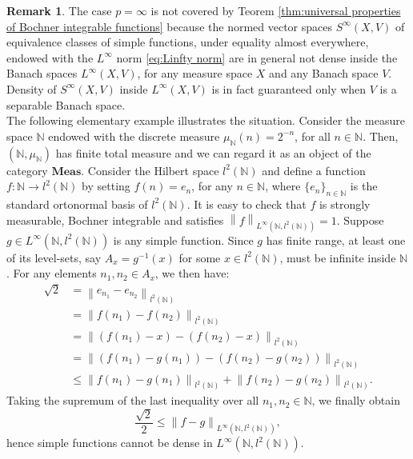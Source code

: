 \documentclass{amsart}
\theoremstyle{definition}
\newtheorem{remark}[definition]{Remark}
\theoremstyle{plain}
\newcommand{\N}{\mathbb{N}}
\newcommand{\norm}[1]{\left\lVert #1\right\rVert} %
\newcommand{\Meas}{\mathbf{Meas}}
\begin{document}
        \begin{remark}
        \label{rem:issue with the infinity case}
            The case $p = \infty$ is not covered by Teorem \ref{thm:universal properties of Bochner integrable functions} because the normed vector spaces $S^\infty(X,V)$ of equivalence classes of simple functions, under equality almost everywhere, endowed with the $L^\infty$ norm \eqref{eq:Linfty norm} are in general not dense inside the Banach spaces $L^\infty(X,V)$, for any measure space $X$ and any Banach space $V$. \\
            Density of $S^\infty(X,V)$ inside $L^\infty(X,V)$ is in fact guaranteed only when $V$ is a separable Banach space. \\  
            The following elementary example illustrates the situation. 
            Consider the measure space $\N$ endowed with the discrete measure $\mu_{\N}(n) = 2^{-n}$, for all $n \in \N$.
            Then, $(\N,\mu_{\N})$ has finite total measure and we can regard it as an object of the category $\Meas$.
            Consider the Hilbert space $l^2(\N)$ and define a function $f \colon \N \rightarrow l^2(\N)$ by setting $f(n) = e_n$, for any $n \in \N$, where $\{e_n\}_{n \in \N}$ is the standard ortonormal basis of $l^2(\N)$.
            It is easy to check that $f$ is strongly measurable, Bochner integrable and satisfies $\norm{f}_{L^\infty\left( \N,l^2(\N) \right)} = 1$.
            Suppose $g \in L^\infty\left( \N,l^2(\N) \right)$ is any simple function.
            Since $g$ has finite range, at least one of its level-sets, say $A_x = g^{-1}(x)$ for some $x \in l^2(\N)$, must be infinite inside $\N$.
            For any elements $n_1,n_2 \in A_x$, we then have:
            \begin{equation*}
                \begin{split}
                    \sqrt{2} &= \norm{e_{n_1} - e_{n_2}}_{l^2(\N)} \\
                    &= \norm{f(n_1) - f(n_2)}_{l^2(\N)} \\
                    &= \norm{\left( f(n_1) - x \right) - \left( f(n_2) - x \right)}_{l^2(\N)} \\
                    &= \norm{\left( f(n_1) - g(n_1) \right) - \left( f(n_2) - g(n_2) \right)}_{l^2(\N)} \\
                    &\leq \norm{f(n_1) - g(n_1)}_{l^2(\N)} + \norm{f(n_2) - g(n_2)}_{l^2(\N)}.
                \end{split}
            \end{equation*}
            Taking the supremum of the last inequality over all $n_1,n_2 \in \N$, we finally obtain
            \begin{equation*}
                \frac{\sqrt{2}}{2} \leq \norm{f - g}_{L^\infty\left( \N,l^2(\N) \right)},
            \end{equation*}
            hence simple functions cannot be dense in $L^\infty\left( \N,l^2(\N) \right)$.
        \end{remark}
\end{document}
